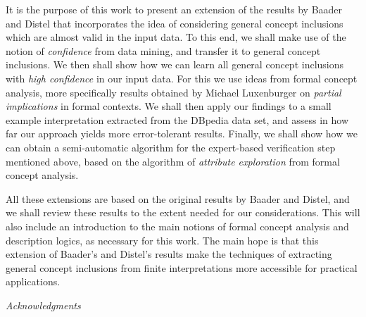 It is the purpose of this work to present an extension of the results by Baader and Distel
that incorporates the idea of considering general concept inclusions which are almost
valid in the input data.  To this end, we shall make use of the notion of
\emph{confidence} from data mining, and transfer it to general concept inclusions.  We
then shall show how we can learn all general concept inclusions with \emph{high
  confidence} in our input data.  For this we use ideas from formal concept analysis, more
specifically results obtained by Michael Luxenburger on \emph{partial implications} in
formal contexts.  We shall then apply our findings to a small example interpretation
extracted from the DBpedia data set, and assess in how far our approach yields more
error-tolerant results.  Finally, we shall show how we can obtain a semi-automatic
algorithm for the expert-based verification step mentioned above, based on the algorithm
of \emph{attribute exploration} from formal concept analysis.

All these extensions are based on the original results by Baader and Distel, and we shall
review these results to the extent needed for our considerations.  This will also include
an introduction to the main notions of formal concept analysis and description logics, as
necessary for this work.  The main hope is that this extension of Baader's and Distel's
results make the techniques of extracting general concept inclusions from finite
interpretations more accessible for practical applications.

\bigskip\noindent%
\textit{Acknowledgments}\hspace*{2em}~

